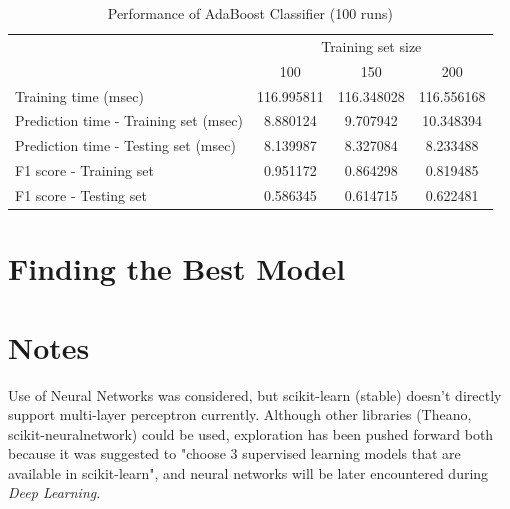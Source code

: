 \documentclass{article}
\begin{document}
	\begin{table}[!ht]
		\centering
		\begin{tabular}{l|ccc}
			\toprule
			{} & \multicolumn{3}{c}{Training set size} \\
			{} &         100 &         150 &         200 \\
			\midrule
			Training time (msec)                  &  116.995811 &  116.348028 &  116.556168 \\
			Prediction time - Training set (msec) &    8.880124 &    9.707942 &   10.348394 \\
			Prediction time - Testing set (msec)  &    8.139987 &    8.327084 &    8.233488 \\
			F1 score - Training set               &    0.951172 &    0.864298 &    0.819485 \\
			F1 score - Testing set                &    0.586345 &    0.614715 &    0.622481 \\
			\bottomrule
		\end{tabular}
		\caption{Performance of AdaBoost Classifier (100 runs)}
		\label{tab:adaboost_weak_100}
	\end{table}
	
	\section{Finding the Best Model}
	
	\section{Notes}
	Use of Neural Networks was considered, but scikit-learn (stable) doesn't directly support multi-layer perceptron currently. Although other libraries (Theano, scikit-neuralnetwork) could be used, exploration has been pushed forward both because it was suggested to "choose 3 supervised learning models that are available in scikit-learn", and neural networks will be later encountered during \emph{Deep Learning}.
	
	
	
\end{document}
